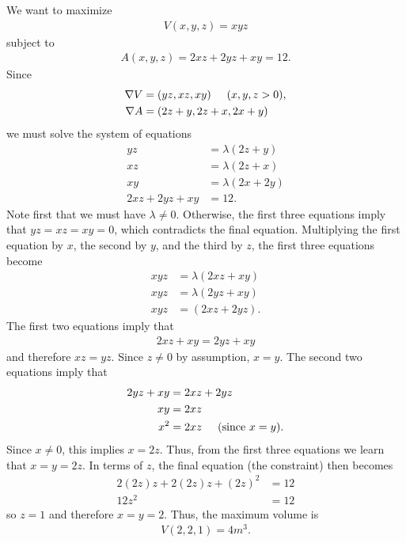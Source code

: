 \documentclass[12pt,letterpaper,reqno]{article}
\numberwithin{equation}{section}
\begin{document}
{\begin{solution}
We want to maximize
\begin{align*}
	V(x,y,z)=xyz
\end{align*}	
subject to
\begin{align*}
	A(x,y,z)=2xz+2yz+xy=12.
\end{align*}
Since
\begin{align*}
	\nabla V&=(yz,xz,xy) \hspace{0.5cm} (x,y,z>0), \\
	\nabla A&=(2z+y,2z+x,2x+y) \\
\end{align*}
we must solve the system of equations
\begin{align*}
	yz&=\lambda(2z+y) \\
	xz&=\lambda(2z+x) \\
	xy&=\lambda(2x+2y) \\
	2xz+2yz+xy&=12.
\end{align*}
Note first that we must have $\lambda \neq 0$. Otherwise, the first three equations imply that $yz=xz=xy=0$, which contradicts the final equation. Multiplying the first equation by $x$, the second by $y$, and the third by $z$, the first three equations become
\begin{align*}
	xyz&=\lambda(2xz+xy) \\
	xyz&=\lambda(2yz+xy) \\
	xyz&=(2xz+2yz).
\end{align*}
The first two equations imply that 
\begin{align*}
	2xz+xy=2yz+xy
\end{align*}
and therefore $xz=yz$. Since $z \neq 0$ by assumption, $x=y$. The second two equations imply that 
\begin{align*}
	2yz+xy&=2xz+2yz \\
	xy&=2xz \\
	x^2&=2xz \hspace{0.5cm} \text{(since $x=y$)}.
\end{align*}
Since $x \neq 0$, this implies $x=2z$. Thus, from the first three equations we learn that $x=y=2z$. In terms of $z$, the final equation (the constraint) then becomes
\begin{align*}
	2(2z)z+2(2z)z+(2z)^2&=12 \\
	12z^2&=12
\end{align*}
so $z=1$ and therefore $x=y=2$. Thus, the maximum volume is 
\begin{align*}
	V(2,2,1)=4m^3.
\end{align*}
\end{solution}

}
\end{document}
